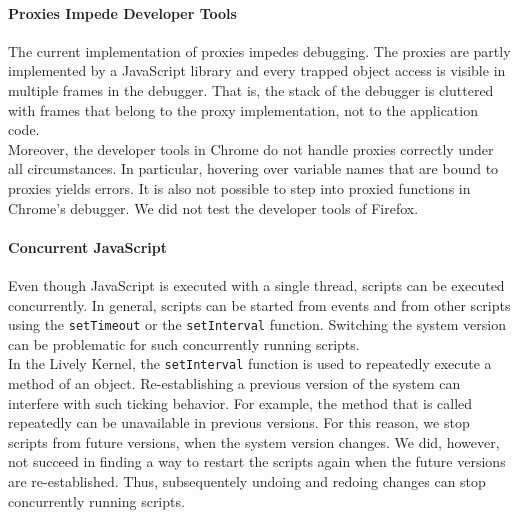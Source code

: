 \paragraph{Proxies Impede Developer Tools}
The current implementation of proxies impedes debugging.
The proxies are partly implemented by a JavaScript library and every trapped object access is visible in multiple frames in the debugger.
That is, the stack of the debugger is cluttered with frames that belong to the proxy implementation, not to the application code.\\
Moreover, the developer tools in Chrome do not handle proxies correctly under all circumstances.
In particular, hovering over variable names that are bound to proxies yields errors.
It is also not possible to step into proxied functions in Chrome's debugger.
We did not test the developer tools of Firefox.

\paragraph{Concurrent JavaScript}
Even though JavaScript is executed with a single thread, scripts can be executed concurrently.
In general, scripts can be started from events and from other scripts using the \lstinline{setTimeout} or the \lstinline{setInterval} function.
Switching the system version can be problematic for such concurrently running scripts.\\
In the Lively Kernel, the \lstinline{setInterval} function is used to repeatedly execute a method of an object.
Re-establishing a previous version of the system can interfere with such ticking behavior.
For example, the method that is called repeatedly can be unavailable in previous versions.
For this reason, we stop scripts from future versions, when the system version changes.
We did, however, not succeed in finding a way to restart the scripts again when the future versions are re-established.
Thus, subsequentely undoing and redoing changes can stop concurrently running scripts.
